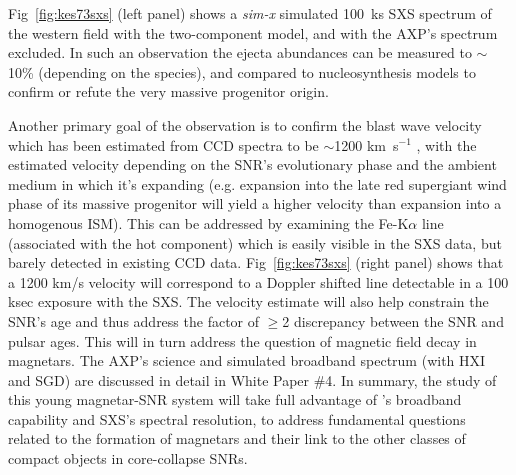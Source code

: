\documentclass[11pt,a4paper]{article}
\begin{document}
{Fig~\ref{fig:kes73sxs} (left panel) shows a \textit{sim-x} simulated 100~ks SXS
spectrum of the western field with the two-component model, and with
the AXP's spectrum excluded.   In such an observation
the ejecta abundances can be measured to $\sim$10\%
(depending on the species), and compared to nucleosynthesis models 
to confirm or refute the very massive progenitor origin.

Another primary goal of the observation is to confirm the blast wave
velocity which has been estimated from CCD spectra to be $\sim$1200
km~s$^{-1}$ \citep{kumar2014}, with the estimated velocity depending on the SNR's
evolutionary phase and the ambient medium in which it's expanding
(e.g. expansion into the late red supergiant wind phase of its massive
progenitor will yield a higher velocity than expansion into a homogenous ISM). 
This can be addressed by examining the Fe-K$\alpha$ line (associated with the hot component)
which is easily visible in the SXS data, but barely detected in
existing CCD data. Fig~\ref{fig:kes73sxs} (right panel) shows that a
1200 km/s velocity will correspond to a Doppler shifted line
detectable in a 100 ksec exposure with the SXS.  The velocity estimate
will also help constrain the SNR's age and thus address the factor of
$\geq$2 discrepancy between the SNR and pulsar ages. 
This will in turn address the question of magnetic field decay in magnetars.
The AXP's science and simulated broadband spectrum (with HXI and SGD) are discussed in 
detail in White Paper \#4.  In summary, the study of this young magnetar-SNR system will take full advantage of \ah's broadband capability
and SXS's spectral resolution, to address fundamental questions related to the formation of magnetars and 
their link to the other classes of compact objects in core-collapse SNRs.

}
\end{document}

